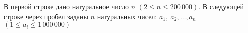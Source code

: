 В первой строке дано натуральное число $n$ $(2 \leqslant  n \leqslant 200\,000)$. В следующей строке через пробел заданы $n$ натуральных чисел: $a_1,\ a_2,\ldots, a_n$ $(1 \leqslant a_i \leq 1\,000\,000)$
